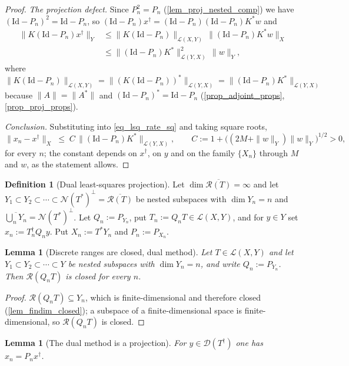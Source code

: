 \documentclass[a4paper]{report}
\theoremstyle{plain}
\newtheorem{lemma}[theorem]{Lemma}
\theoremstyle{definition}
\newtheorem{definition}[theorem]{Definition}
\theoremstyle{remark}
\newcommand{\Ll}{\mathcal{L}}
\newcommand{\Ran}{\mathcal{R}}
\newcommand{\Ker}{\mathcal{N}}
\newcommand{\Dom}{\mathcal{D}}
\newcommand{\Id}{\mathrm{Id}}
\newcommand{\dg}{^{\dagger}}
\begin{document}
\begin{proof}
  \emph{The projection defect.}  Since $P_n^{2} = P_n$ (\cref{lem_proj_nested_comp}) we have
  $(\Id-P_n)^{2} = \Id - P_n$, so $(\Id-P_n)x\dg = (\Id-P_n)(\Id-P_n)K^{*}w$ and
  \[
    \begin{aligned}
      \|K(\Id-P_n)x\dg\|_Y
        &\le \|K(\Id-P_n)\|_{\Ll(X,Y)}\,\|(\Id-P_n)K^{*}w\|_X \\
        &\le \|(\Id-P_n)K^{*}\|_{\Ll(Y,X)}^{2}\,\|w\|_Y ,
    \end{aligned}
  \]
  where $\|K(\Id-P_n)\|_{\Ll(X,Y)} = \|(K(\Id-P_n))^{*}\|_{\Ll(Y,X)} =
  \|(\Id-P_n)K^{*}\|_{\Ll(Y,X)}$ because $\|A\| = \|A^{*}\|$ and $(\Id-P_n)^{*} =
  \Id-P_n$ (\cref{prop_adjoint_props}, \cref{prop_proj_props}).

  \emph{Conclusion.}  Substituting into \eqref{eq_lsq_rate_sq} and taking square roots,
  \[
    \|x_n - x\dg\|_X \;\le\; C\,\|(\Id-P_n)K^{*}\|_{\Ll(Y,X)},
    \qquad C := 1 + \bigl((2M + \|w\|_Y)\|w\|_Y\bigr)^{1/2} > 0 ,
  \]
  for every $n$; the constant depends on $x\dg$, on $y$ and on the family $\{X_n\}$
  through $M$ and $w$, as the statement allows.
\end{proof}


\begin{definition}[Dual least-squares projection]
  \label{def_dual_lsq_projection}
  Let $\dim \overline{\Ran(T)} = \infty$ and let
  $Y_1 \subset Y_2 \subset \cdots \subset \Ker(T^{*})^{\perp} = \overline{\Ran(T)}$ be
  nested subspaces with $\dim Y_n = n$ and $\overline{\bigcup_n Y_n} =
  \Ker(T^{*})^{\perp}$.  Let $Q_n := P_{Y_n}$, put $T_n := Q_n T \in \Ll(X,Y)$, and for
  $y \in Y$ set $x_n := T_n\dg Q_n y$.  Put $X_n := T^{*}Y_n$ and $P_n := P_{X_n}$.
\end{definition}


\begin{lemma}[Discrete ranges are closed, dual method]
  \label{lem_dual_lsq_range_closed}
  Let $T \in \Ll(X,Y)$ and let $Y_1 \subset Y_2 \subset \cdots \subset Y$ be nested
  subspaces with $\dim Y_n = n$, and write $Q_n := P_{Y_n}$.  Then $\Ran(Q_nT)$ is closed
  for every $n$.
\end{lemma}

\begin{proof}
  $\Ran(Q_nT) \subseteq Y_n$, which is finite-dimensional and therefore closed
  (\cref{lem_findim_closed}); a subspace of a finite-dimensional space is
  finite-dimensional, so $\Ran(Q_nT)$ is closed.
\end{proof}


\begin{lemma}[The dual method is a projection]
  \label{lem_dual_lsq_formula}
  For $y \in \Dom(T\dg)$ one has $x_n = P_n x\dg$.
\end{lemma}
\end{document}
